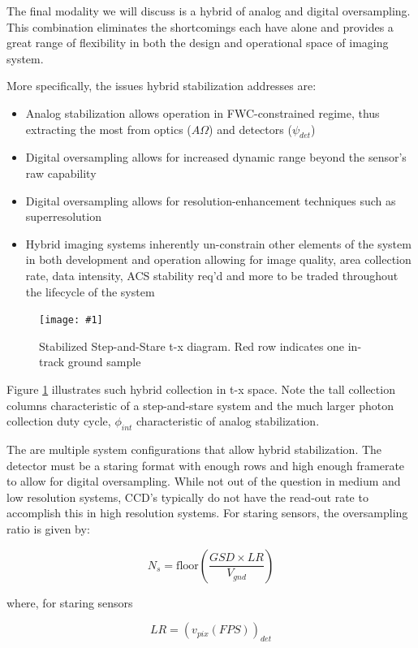 \documentclass[10pt,journal]{IEEEtran}  %
\newcommand{\includefigure}[3]
{
  \begin{figure}[h!]
  \centering
  \texttt{[image: \#1]}
  \caption[]{#3}
  \label{#2}
  \end{figure}
}
\begin{document}
The final modality we will discuss is a hybrid of analog and digital oversampling.  This combination eliminates the shortcomings each have alone and provides a great range of flexibility in both the design and operational space of imaging system.

More specifically, the issues hybrid stabilization addresses are:

\begin{itemize}
    \item Analog stabilization allows operation in FWC-constrained regime, thus extracting the most from optics ($A\Omega$) and detectors ($\psi_{det}$)
    \item Digital oversampling allows for increased dynamic range beyond the sensor's raw capability
    \item Digital oversampling allows for resolution-enhancement techniques such as superresolution
    \item Hybrid imaging systems inherently un-constrain other elements of the system in both development and operation allowing for image quality, area collection rate, data intensity, ACS stability req'd and more to be traded throughout the lifecycle of the system
\end{itemize}

\includefigure{figures/stab_step_stare.pgf}{fig:stab_step_stare}{Stabilized Step-and-Stare t-x diagram.  Red row indicates one in-track ground sample}

Figure \ref{fig:stab_step_stare} illustrates such hybrid collection in t-x space.  Note the tall collection columns characteristic of a step-and-stare system and the much larger photon collection duty cycle, $\phi_{int}$ characteristic of analog stabilization.  

The are multiple system configurations that allow hybrid stabilization.  The detector must be a staring format with enough rows and high enough framerate to allow for digital oversampling.  While not out of the question in medium and low resolution systems, CCD's typically do not have the read-out rate to accomplish this in high resolution systems.  For staring sensors, the oversampling ratio is given by:

\begin{equation}
    N_s = \text{floor}\left(\frac{GSD \times LR}{V_{gnd}}\right)
\end{equation}

where, for staring sensors

\begin{equation}
\label{eq:lr_framing}    
LR = \left(v_{pix}(FPS)\right)_{det}
\end{equation}
\end{document}
